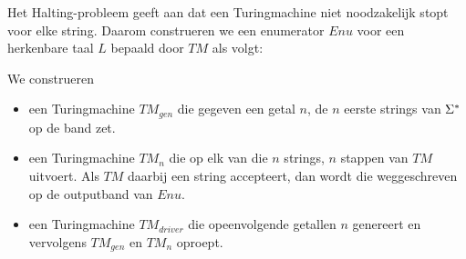  Het Halting-probleem geeft aan dat een Turingmachine niet noodzakelijk stopt voor elke string. Daarom construeren we een enumerator $Enu$ voor een herkenbare taal $L$ bepaald door $TM$ als volgt:
 
  We construeren
  \begin{itemize}
  \item een Turingmachine $TM_{gen}$ die gegeven een getal $n$, de $n$ eerste strings van $\Sigma^*$ op de band zet.
  \item een Turingmachine $TM_n$ die op elk van die $n$ strings, $n$ stappen van $TM$ uitvoert. Als $TM$ daarbij een string accepteert, dan wordt die weggeschreven op de outputband van $Enu$.
  \item een Turingmachine $TM_{driver}$ die opeenvolgende getallen $n$ genereert en vervolgens $TM_{gen}$ en $TM_n$ oproept.
  \end{itemize}